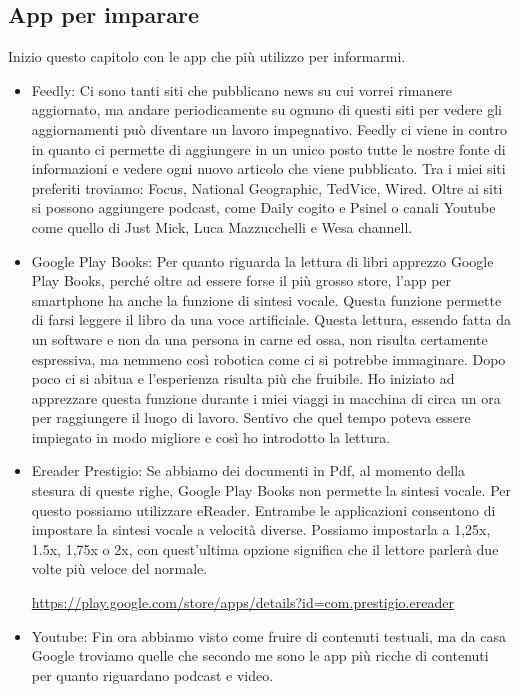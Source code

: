 \subsection{App per imparare}
Inizio questo capitolo con le app che più utilizzo per informarmi.

\begin{itemize}
\item Feedly: Ci sono tanti siti che pubblicano news su cui vorrei rimanere aggiornato, ma andare periodicamente su
ognuno di questi siti per vedere gli aggiornamenti può diventare un lavoro impegnativo. Feedly ci viene in contro in
quanto ci permette di aggiungere in un unico posto tutte le nostre fonte di informazioni e vedere ogni nuovo articolo
che viene pubblicato. Tra i miei siti preferiti troviamo: Focus, National Geographic, TedVice, Wired. Oltre ai siti si
possono aggiungere podcast, come Daily cogito e Psinel o canali Youtube come quello di Just Mick, Luca Mazzucchelli e
Wesa channell.
\item Google Play Books: Per quanto riguarda la lettura di libri apprezzo Google Play Books, perché oltre ad essere
forse il più grosso store, l'app per smartphone ha anche la funzione di sintesi vocale. Questa
funzione permette di farsi leggere il libro da una voce artificiale. Questa lettura, essendo fatta da un software e non
da una persona in carne ed ossa, non risulta certamente espressiva, ma nemmeno così robotica come ci si potrebbe
immaginare. Dopo poco ci si abitua e l'esperienza risulta più che fruibile. Ho iniziato ad
apprezzare questa funzione durante i miei viaggi in macchina di circa un ora per raggiungere il luogo di lavoro.
Sentivo che quel tempo poteva essere impiegato in modo migliore e così ho introdotto la lettura.
\item Ereader Prestigio: Se abbiamo dei documenti in Pdf, al momento della stesura di queste righe, Google Play Books
non permette la sintesi vocale. Per questo possiamo utilizzare eReader. Entrambe le applicazioni consentono di
impostare la sintesi vocale a velocità diverse. Possiamo impostarla a 1,25x, 1.5x, 1,75x o 2x, con
quest'ultima opzione significa che il lettore parlerà due volte più veloce del normale.
\raggedright\url{https://play.google.com/store/apps/details?id=com.prestigio.ereader} 
\item Youtube: Fin ora abbiamo visto come fruire di contenuti testuali, ma da casa Google troviamo
quelle che secondo me sono le app più ricche di contenuti per quanto riguardano podcast e video.
\end{itemize}


